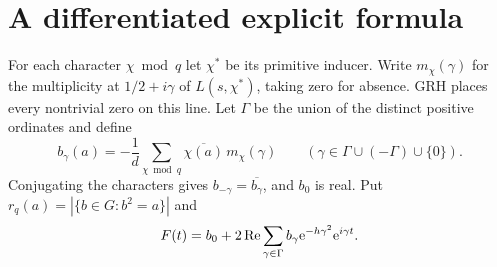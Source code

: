 \section{A differentiated explicit formula}
For each character \(\chi\bmod q\) let \(\chi^*\) be its primitive inducer. Write \(m_\chi(\gamma)\) for the multiplicity at \(1/2+i\gamma\) of \(L(s,\chi^*)\), taking zero for absence. GRH places every nontrivial zero on this line. Let \(\Gamma\) be the union of the distinct positive ordinates and define
\[
 b_\gamma(a)=-\frac1d\sum_{\chi\bmod q}\overline{\chi(a)}\,m_\chi(\gamma)
 \qquad(\gamma\in\Gamma\cup(-\Gamma)\cup\{0\}).
\]
Conjugating the characters gives \(b_{-\gamma}=\overline{b_\gamma}\), and \(b_0\) is real. Put \(r_q(a)=|\{b\in G:b^2=a\}|\) and
\[
 F(t)=b_0+2\operatorname{Re}\sum_{\gamma\in\Gamma}b_\gamma\mathrm e^{-h\gamma^2}\mathrm e^{i\gamma t}.
\]

